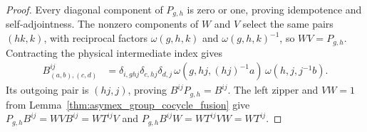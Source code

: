 \begin{proof}
    \leanok
    Every diagonal component of $P_{g,h}$ is zero or one, proving
    idempotence and self-adjointness. The nonzero components of $W$ and
    $V$ select the same pairs $(hk,k)$, with reciprocal factors
    $\omega(g,h,k)$ and $\omega(g,h,k)^{-1}$, so $WV=P_{g,h}$.
    Contracting the physical intermediate index gives
    \begin{align}
        B^{ij}_{(a,b),(c,d)}
         & =\delta_{i,ghj}\delta_{c,hj}\delta_{d,j}\,
        \omega(g,hj,(hj)^{-1}a)\,\omega(h,j,j^{-1}b).
        \label{eq:asymex_pbc_stacked_letter}
    \end{align}
    Its outgoing pair is $(hj,j)$, proving $B^{ij}P_{g,h}=B^{ij}$.
    The left zipper and $VW=1$ from
    Lemma~\ref{thm:asymex_group_cocycle_fusion} give
    $P_{g,h}B^{ij}=WVB^{ij}=WT^{ij}V$ and
    $P_{g,h}B^{ij}W=WT^{ij}VW=WT^{ij}$.
\end{proof}

